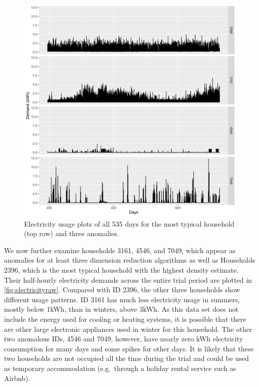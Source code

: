 \documentclass[
]{article}
\begin{document}
\begin{figure}

{\centering \includegraphics[width=0.95\linewidth]{figures/Electricity_2d_compare4id_1typical_3anomalous} 

}

\caption{Electricity usage plots of all 535 days for the most typical household (top row) and three anomalies.}\label{fig:electricityraw}
\end{figure}

We now further examine households 3161, 4546, and 7049, which appear as
anomalies for at least three dimension reduction algorithms as well as
Households 2396, which is the most typical household with the highest
density estimate. Their half-hourly electricity demands across the
entire trial period are plotted in \autoref{fig:electricityraw}.
Compared with ID 2396, the other three households show different usage
patterns. ID 3161 has much less electricity usage in summers, mostly
below 1kWh, than in winters, above 3kWh. As this data set does not
include the energy used for cooling or heating systems, it is possible
that there are other large electronic appliances used in winter for this
household. The other two anomalous IDs, 4546 and 7049, however, have
nearly zero kWh electricity consumption for many days and some spikes
for other days. It is likely that these two households are not occupied
all the time during the trial and could be used as temporary
accommodation (e.g.~through a holiday rental service such as Airbnb).
\end{document}
